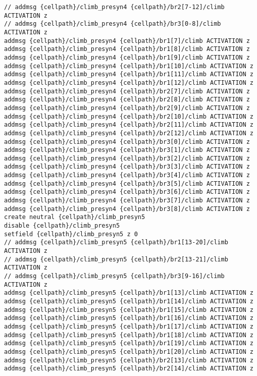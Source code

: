 \documentclass[10pt]{article}
\begin{document}
\begin{verbatim}
// addmsg {cellpath}/climb_presyn4 {cellpath}/br2[7-12]/climb ACTIVATION z
// addmsg {cellpath}/climb_presyn4 {cellpath}/br3[0-8]/climb ACTIVATION z
addmsg {cellpath}/climb_presyn4 {cellpath}/br1[7]/climb ACTIVATION z
addmsg {cellpath}/climb_presyn4 {cellpath}/br1[8]/climb ACTIVATION z
addmsg {cellpath}/climb_presyn4 {cellpath}/br1[9]/climb ACTIVATION z
addmsg {cellpath}/climb_presyn4 {cellpath}/br1[10]/climb ACTIVATION z
addmsg {cellpath}/climb_presyn4 {cellpath}/br1[11]/climb ACTIVATION z
addmsg {cellpath}/climb_presyn4 {cellpath}/br1[12]/climb ACTIVATION z
addmsg {cellpath}/climb_presyn4 {cellpath}/br2[7]/climb ACTIVATION z
addmsg {cellpath}/climb_presyn4 {cellpath}/br2[8]/climb ACTIVATION z
addmsg {cellpath}/climb_presyn4 {cellpath}/br2[9]/climb ACTIVATION z
addmsg {cellpath}/climb_presyn4 {cellpath}/br2[10]/climb ACTIVATION z
addmsg {cellpath}/climb_presyn4 {cellpath}/br2[11]/climb ACTIVATION z
addmsg {cellpath}/climb_presyn4 {cellpath}/br2[12]/climb ACTIVATION z
addmsg {cellpath}/climb_presyn4 {cellpath}/br3[0]/climb ACTIVATION z
addmsg {cellpath}/climb_presyn4 {cellpath}/br3[1]/climb ACTIVATION z
addmsg {cellpath}/climb_presyn4 {cellpath}/br3[2]/climb ACTIVATION z
addmsg {cellpath}/climb_presyn4 {cellpath}/br3[3]/climb ACTIVATION z
addmsg {cellpath}/climb_presyn4 {cellpath}/br3[4]/climb ACTIVATION z
addmsg {cellpath}/climb_presyn4 {cellpath}/br3[5]/climb ACTIVATION z
addmsg {cellpath}/climb_presyn4 {cellpath}/br3[6]/climb ACTIVATION z
addmsg {cellpath}/climb_presyn4 {cellpath}/br3[7]/climb ACTIVATION z
addmsg {cellpath}/climb_presyn4 {cellpath}/br3[8]/climb ACTIVATION z
create neutral {cellpath}/climb_presyn5
disable {cellpath}/climb_presyn5
setfield {cellpath}/climb_presyn5 z 0
// addmsg {cellpath}/climb_presyn5 {cellpath}/br1[13-20]/climb ACTIVATION z
// addmsg {cellpath}/climb_presyn5 {cellpath}/br2[13-21]/climb ACTIVATION z
// addmsg {cellpath}/climb_presyn5 {cellpath}/br3[9-16]/climb ACTIVATION z
addmsg {cellpath}/climb_presyn5 {cellpath}/br1[13]/climb ACTIVATION z
addmsg {cellpath}/climb_presyn5 {cellpath}/br1[14]/climb ACTIVATION z
addmsg {cellpath}/climb_presyn5 {cellpath}/br1[15]/climb ACTIVATION z
addmsg {cellpath}/climb_presyn5 {cellpath}/br1[16]/climb ACTIVATION z
addmsg {cellpath}/climb_presyn5 {cellpath}/br1[17]/climb ACTIVATION z
addmsg {cellpath}/climb_presyn5 {cellpath}/br1[18]/climb ACTIVATION z
addmsg {cellpath}/climb_presyn5 {cellpath}/br1[19]/climb ACTIVATION z
addmsg {cellpath}/climb_presyn5 {cellpath}/br1[20]/climb ACTIVATION z
addmsg {cellpath}/climb_presyn5 {cellpath}/br2[13]/climb ACTIVATION z
addmsg {cellpath}/climb_presyn5 {cellpath}/br2[14]/climb ACTIVATION z

\end{verbatim}
\end{document}

